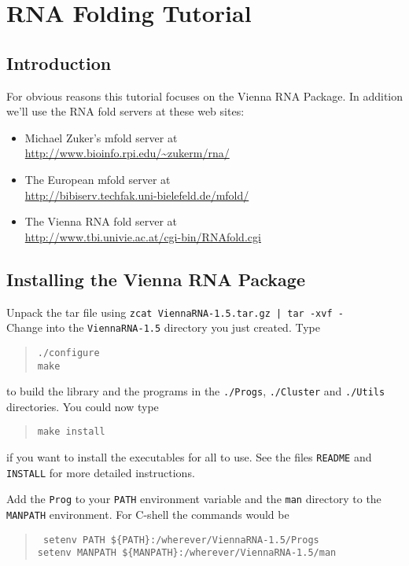\documentclass{article}
\begin{document}
\section{RNA Folding Tutorial}

\subsection{Introduction}

For obvious reasons this tutorial focuses on the Vienna RNA Package.
In addition we'll use the RNA fold servers at these web sites:
\begin{itemize}
\item Michael Zuker's mfold server at\\
\url{http://www.bioinfo.rpi.edu/~zukerm/rna/}
\item The European mfold server at\\
\url{http://bibiserv.techfak.uni-bielefeld.de/mfold/}
\item The Vienna RNA fold server at\\
\url{http://www.tbi.univie.ac.at/cgi-bin/RNAfold.cgi}
\end{itemize}

\subsection{Installing the Vienna RNA Package}

Unpack the tar file using {\tt zcat ViennaRNA-1.5.tar.gz | tar -xvf -}\\
Change into the {\tt ViennaRNA-1.5} directory you just created.
Type
\begin{quote}
\tt ./configure\\
make
\end{quote}
to build the library and the programs in the {\tt ./Progs}, {\tt ./Cluster}
and {\tt ./Utils} directories. You could now type
\begin{quote}
\tt make install
\end{quote}
if you want to install the executables for all to use.
See the files {\tt README} and {\tt INSTALL} for more detailed instructions. 

Add the {\tt Prog} to your {\tt PATH} environment variable and the {\tt man}
directory to the {\tt MANPATH} environment. For C-shell the commands would
be
\begin{quote}\tt
setenv PATH \$\{PATH\}:/wherever/ViennaRNA-1.5/Progs\\
setenv MANPATH \$\{MANPATH\}:/wherever/ViennaRNA-1.5/man
\end{quote}
\end{document}
